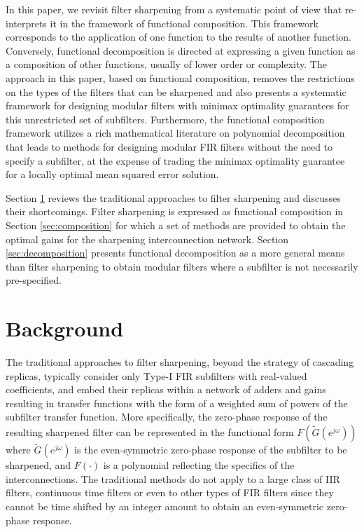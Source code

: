 \documentclass[journal] {IEEEtran}
\begin{document}
In this paper, we revisit filter sharpening from a systematic point of view that re-interprets it in the framework of functional composition. This framework corresponds to the application of one function to the results of another function. Conversely, functional decomposition is directed at expressing a given function as a composition of other functions, usually of lower order or complexity. The approach in this paper, based on functional composition, removes the restrictions on the types of the filters that can be sharpened and also presents a systematic framework for designing modular filters with minimax optimality guarantees for this unrestricted set of subfilters. Furthermore, the functional composition framework utilizes a rich mathematical literature on polynomial decomposition that leads to methods for designing modular FIR filters without the need to specify a subfilter, at the expense of trading the minimax optimality guarantee for a locally optimal mean squared error solution.

Section \ref{sec:sharpening} reviews the traditional approaches to filter sharpening and discusses their shortcomings. Filter sharpening is expressed as functional composition in Section \ref{sec:composition} for which a set of methods are provided to obtain the optimal gains for the sharpening interconnection network. Section \ref{sec:decomposition} presents functional decomposition as a more general means than filter sharpening to obtain modular filters where a subfilter is not necessarily pre-specified. 

\section{Background}\label{sec:sharpening}
The traditional approaches to filter sharpening, beyond the strategy of cascading replicas, typically consider only Type-I FIR subfilters with real-valued coefficients, and embed their replicas within a network of adders and gains resulting in transfer functions with the form of a weighted sum of powers of the subfilter transfer function. More specifically, the zero-phase response of the resulting sharpened filter can be represented in the functional form $F(\tilde{G}(e^{j\omega}))$ where $\tilde{G}(e^{j\omega})$ is the even-symmetric zero-phase response of the subfilter to be sharpened, and $F(\cdot)$ is a polynomial reflecting the specifics of the interconnections. The traditional methods do not apply to a large class of IIR filters, continuous time filters or even to other types of FIR filters since they cannot be time shifted by an integer amount to obtain an even-symmetric zero-phase response.
\end{document}

